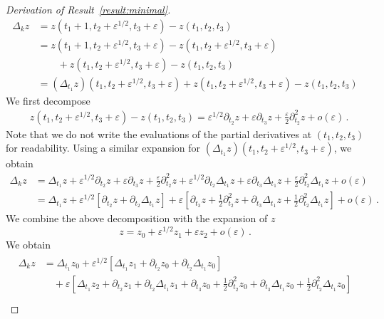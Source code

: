 \documentclass[11pt,english,reqno]{article}
\theoremstyle{plain}
\theoremstyle{definition}
\theoremstyle{remark}
\numberwithin{equation}{section}
\begin{document}
\begin{proof}[Derivation of Result~\ref{result:minimal}]
\begin{align}
    \Delta_k z &= z(t_1 + 1, t_2 + \varepsilon^{1/2}, t_3 + \varepsilon) - z(t_1, t_2, t_3) \nonumber\\
    &= z(t_1 + 1, t_2 + \varepsilon^{1/2}, t_3 + \varepsilon) - z(t_1 , t_2 + \varepsilon^{1/2}, t_3 + \varepsilon) \nonumber\\
    &\qquad+ z(t_1 , t_2 + \varepsilon^{1/2}, t_3 + \varepsilon) - z(t_1, t_2, t_3) \nonumber\\
    &= (\Delta_{t_1} z)(t_1, t_2 + \varepsilon^{1/2}, t_3 + \varepsilon) + z(t_1 , t_2 + \varepsilon^{1/2}, t_3 + \varepsilon) - z(t_1, t_2, t_3) \label{eq:aux-4}
\end{align}
We first decompose 
\begin{align*}
    &z(t_1 , t_2 + \varepsilon^{1/2}, t_3 + \varepsilon) - z(t_1, t_2, t_3) = \varepsilon^{1/2} \partial_{t_2} z + \varepsilon \partial_{t_3} z + \frac{\varepsilon}{2} \partial_{t_2}^2 z + o(\varepsilon) \, .
\end{align*}
Note that we do not write the evaluations of the partial derivatives at $(t_1, t_2, t_3)$ for readability. Using a similar expansion for $(\Delta_{t_1} z)(t_1, t_2 + \varepsilon^{1/2}, t_3 + \varepsilon)$, we obtain 
\begin{align*}
    \Delta_k z &= \Delta_{t_1} z + \varepsilon^{1/2} \partial_{t_2} z + \varepsilon \partial_{t_3} z + \frac{\varepsilon}{2} \partial_{t_2}^2 z + \varepsilon^{1/2} \partial_{t_2} \Delta_{t_1} z + \varepsilon \partial_{t_3} \Delta_{t_1}z + \frac{\varepsilon}{2} \partial_{t_2}^2 \Delta_{t_1}z +o(\varepsilon) \\
    &= \Delta_{t_1} z + \varepsilon^{1/2} \left[\partial_{t_2} z + \partial_{t_2} \Delta_{t_1} z\right] + \varepsilon \left[\partial_{t_3} z + \frac{1}{2} \partial_{t_2}^2 z + \partial_{t_3} \Delta_{t_1}z + \frac{1}{2} \partial_{t_2}^2 \Delta_{t_1}z\right] + o(\varepsilon) \, . 
\end{align*}
We combine the above decomposition with the expansion of $z$ 
\begin{equation*}
    z = z_0 + \varepsilon^{1/2} z_1 + \varepsilon z_2 +  o(\varepsilon) \, .
\end{equation*}
We obtain 
\begin{align}
    \label{eq:lhs}
    \begin{split}
    \Delta_k z &= \Delta_{t_1} z_0 + \varepsilon^{1/2} \left[\Delta_{t_1} z_1 + \partial_{t_2} z_0 +  \partial_{t_2} \Delta_{t_1}z_0 \right] \\
    &\quad+ \varepsilon \left[\Delta_{t_1} z_2 + \partial_{t_2} z_1 + \partial_{t_2} \Delta_{t_1} z_1 + \partial_{t_3} z_0 + \frac{1}{2} \partial_{t_2}^2 z_0  + \partial_{t_3} \Delta_{t_1} z_0 + \frac{1}{2} \partial_{t_2}^2 \Delta_{t_1} z_0\right] \\

\end{split}
\end{align}
\end{proof}
\end{document}
